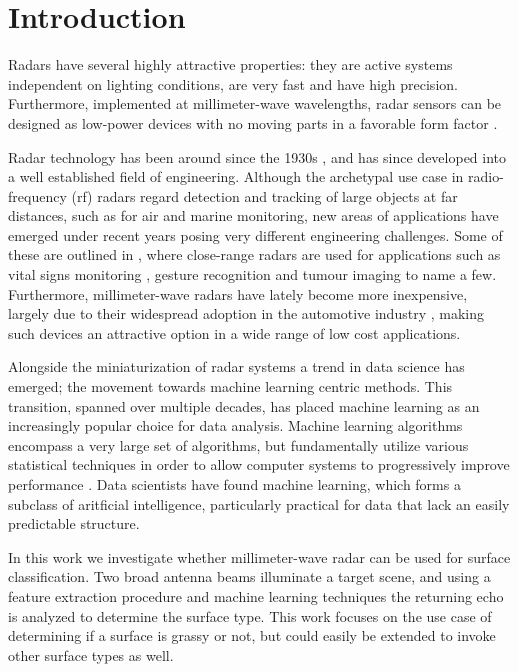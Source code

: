 \chapter{Introduction}


Radars have several highly attractive properties: they are active systems independent on lighting conditions, are very fast and have high precision. Furthermore, implemented at millimeter-wave wavelengths, radar sensors can be designed as low-power devices with no moving parts in a favorable form factor \citep{lien_gillian_karagozler_amihood_schwesig_olson_raja_poupyrev_2016}.

Radar technology has been around since the 1930s \citep{watson-watt_1945}, and has since developed into a well established field of engineering. Although the archetypal use case in radio-frequency (\gls{rf}) radars regard detection and tracking of large objects at far distances, such as for air and marine monitoring, new areas of applications have emerged under recent years posing very different engineering challenges. Some of these are outlined in \citep{amin_2017}, where close-range radars are used for applications such as vital signs monitoring \citep{kuo_lin_yu_lo_lyu_chou_chuang_2016}, gesture recognition \citep{lien_gillian_karagozler_amihood_schwesig_olson_raja_poupyrev_2016} and tumour imaging \citep{klemm_gibbins_leendertz_horseman_preece_benjamin_craddock_2011} to name a few. Furthermore, millimeter-wave radars have lately become more inexpensive, largely due to their widespread adoption in the automotive industry \citep{frenzel_2018}, making such devices an attractive option in a wide range of low cost applications.

Alongside the miniaturization of radar systems a trend in data science has emerged; the movement towards machine learning centric methods. This transition, spanned over multiple decades, has placed machine learning as an increasingly popular choice for data analysis. Machine learning algorithms encompass a very large set of algorithms, but fundamentally utilize various statistical techniques in order to allow computer systems to progressively improve performance \citep{a_smola_svn_vishwanathan_2010}. Data scientists have found machine learning, which forms a subclass of aritficial intelligence, particularly practical for data that lack an easily predictable structure.

In this work we investigate whether millimeter-wave radar can be used for surface classification. Two broad antenna beams illuminate a target scene, and using a feature extraction procedure and machine learning techniques the returning echo is analyzed to determine the surface type. This work focuses on the use case of determining if a surface is grassy or not, but could easily be extended to invoke other surface types as well.  

